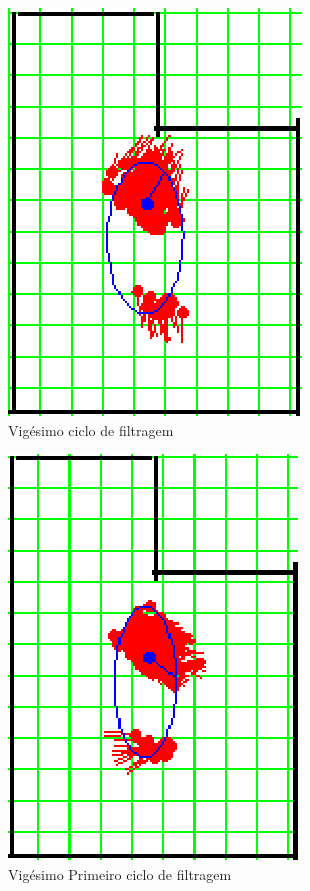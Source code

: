 \begin{figure}[H]
  \centering
  \includegraphics[scale=0.6]{figuras/cen1_ex3/21.eps}
  \caption[Vigésimo Ciclo de Filtragem]{Vigésimo ciclo de filtragem}
  \label{img:cen1_ex3_21}
\end{figure}

\begin{figure}[H]
  \centering
  \includegraphics[scale=0.6]{figuras/cen1_ex3/22.eps}
  \caption[Vigésimo Primeiro Ciclo de Filtragem]{Vigésimo Primeiro ciclo de filtragem}
  \label{img:cen1_ex3_22}
\end{figure}

